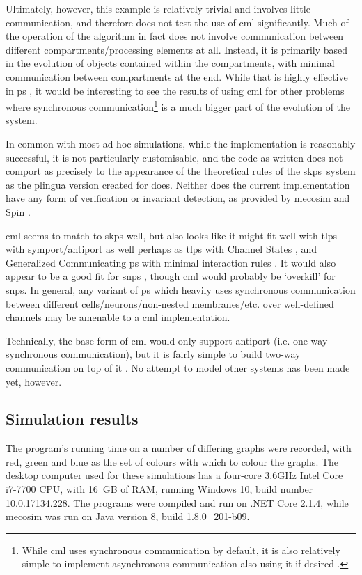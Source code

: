 Ultimately, however, this example is relatively trivial and involves little communication, and therefore does not test the use of \gls{cml} significantly.  Much of the operation of the algorithm in fact does not involve communication between different compartments/processing elements at all.  Instead, it is primarily based in the evolution of objects contained within the compartments, with minimal communication between compartments at the end.  While that is highly effective in \gls{ps} \cite{Paun2008}, it would be interesting to see the results of using \gls{cml} for other problems where synchronous communication\footnote{While \gls{cml} uses synchronous communication by default, it is also relatively simple to implement asynchronous communication also using it if desired \cite{Reppy2007}.} is a much bigger part of the evolution of the system.

In common with most ad-hoc simulations, while the implementation is reasonably successful, it is not particularly customisable, and the code as written does not comport as precisely to the appearance of the theoretical rules of the \gls{skps}~system as the \gls{plingua} version created for \cite{Gheorghe2013} does.  Neither does the current implementation have any form of verification or invariant detection, as provided by \gls{mecosim} \cite{Perez-Hurtado2010} and Spin \cite{Ben-Ari2008,Lefticaru2011}.%

\gls{cml} seems to match to \gls{skps} well, but also looks like it might fit well with \gls{tlps} with symport/antiport \cite{Verlan2005} as well perhaps as \gls{tlps} with Channel States \cite{Song2016}, and Generalized Communicating \gls{ps} with minimal interaction rules \cite{Csuhaj-Varju2011}.  It would also appear to be a good fit for \gls{snps} \cite{Ionescu2006}, though \gls{cml} would probably be `overkill' for \gls{snps}.  In general, any variant of \gls{ps} which heavily uses synchronous communication between different cells/neurons/non-nested membranes/etc. over well-defined channels may be amenable to a \gls{cml} implementation.

Technically, the base form of \gls{cml} would only support antiport (i.e. one-way synchronous communication), but it is fairly simple to build two-way communication on top of it \cite[ch.~6]{Reppy2007}.  No attempt to model other systems has been made yet, however.

\subsection{Simulation results}
The program's running time on a number of differing graphs were recorded, with red, green and blue as the set of colours with which to colour the graphs.  The desktop computer used for these simulations has a four-core 3.6GHz Intel Core i7-7700 CPU, with 16 GB of RAM, running Windows 10, build number 10.0.17134.228.  The \fsharp{} programs were compiled and run on .NET Core 2.1.4, while \gls{mecosim} was run on Java version 8, build 1.8.0\_201-b09. 


